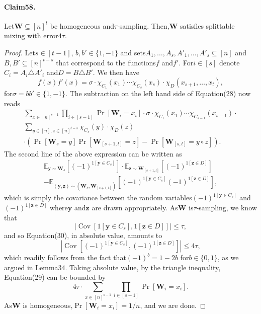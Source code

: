 \documentclass[10pt,a4paper]{article}
\DeclareMathOperator{\Cov}{Cov}
\begin{document}
\paragraph{Claim58.} Let$\mathbf W\subseteq[n]^t$ be homogeneous and$\tau$-sampling. Then,$\mathbf W$ satisfies splittable mixing with error$4\tau$.
\begin{proof}
Let$s\in[t-1]$, $b,b'\in\{1,-1\}$ and sets$A_1,\ldots,A_s,A'_1,\ldots,A'_s\subseteq[n]$ and$B,B'\subseteq[n]^{t-s}$ that correspond to the functions$f$ and$f'$. For$i\in[s]$ denote$C_i=A_i\triangle A'_i$ and$D=B\triangle B'$. We then have
\[f(x)f'(x)=\sigma\cdot\chi_{C_1}(x_1)\cdots\chi_{C_s}(x_s)\cdot\chi_D(x_{s+1},\ldots,x_t),\]
for$\sigma=bb'\in\{1,-1\}$. The subtraction on the left hand side of Equation(28) now reads
\begin{multline*}
\sum_{x\in[n]^{s-1}}\prod_{i\in[s-1]}\Pr[\mathbf W_i=x_i]\cdot\sigma\cdot\chi_{C_1}(x_1)\cdots\chi_{C_{s-1}}(x_{s-1})\cdot\\
\sum_{y\in[n],z\in[n]^{t-s}}\chi_{C_s}(y)\cdot\chi_D(z)\\
\cdot(\Pr[\mathbf W_s=y]\Pr[\mathbf W_{[s+1,t]}=z]-\Pr[\mathbf W_{[s,t]}=y\circ z]).\tag{29}
\end{multline*}
The second line of the above expression can be written as
\begin{multline*}
\mathbb E_{\mathbf y\sim\mathbf W_s}[(-1)^{1[\mathbf y\in C_s]}]\cdot\mathbb E_{\mathbf z\sim\mathbf W_{[s+1,t]}}[(-1)^{1[\mathbf z\in D]}]\\
-\mathbb E_{(\mathbf y,\mathbf z)\sim(\mathbf W_s,\mathbf W_{[s+1,t]})}[(-1)^{1[\mathbf y\in C_s]}(-1)^{1[\mathbf z\in D]}],\tag{30}
\end{multline*}
which is simply the covariance between the random variables$(-1)^{1[\mathbf y\in C_s]}$ and$(-1)^{1[\mathbf z\in D]}$ where$\mathbf y$ and$\mathbf z$ are drawn appropriately. As$\mathbf W$ is$\tau$-sampling, we know that
\[|\Cov[1[\mathbf y\in C_s],1[\mathbf z\in D]]|\leq\tau,\]
and so Equation(30), in absolute value, amounts to
\[|\Cov[(-1)^{1[\mathbf y\in C_s]},(-1)^{1[\mathbf z\in D]}]|\leq4\tau,\]
which readily follows from the fact that$(-1)^b=1-2b$ for$b\in\{0,1\}$, as we argued in Lemma34. Taking absolute value, by the triangle inequality, Equation(29) can be bounded by
\[4\tau\cdot\sum_{x\in[n]^{s-1}}\prod_{i\in[s-1]}\Pr[\mathbf W_i=x_i].\]
As$\mathbf W$ is homogeneous,$\Pr[\mathbf W_i=x_i]=1/n$, and we are done.
\end{proof}
\end{document}
